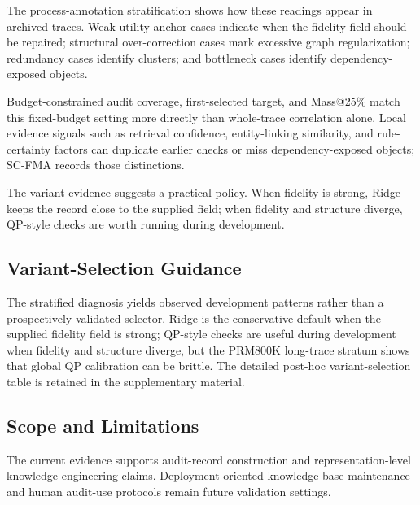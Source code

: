 \documentclass[pdflatex,sn-mathphys-num,iicol]{sn-jnl}
\begin{document}
The process-annotation stratification shows how these readings appear in archived traces. Weak utility-anchor cases indicate when the fidelity field should be repaired; structural over-correction cases mark excessive graph regularization; redundancy cases identify clusters; and bottleneck cases identify dependency-exposed objects.

Budget-constrained audit coverage, first-selected target, and Mass@25\% match this fixed-budget setting more directly than whole-trace correlation alone. Local evidence signals such as retrieval confidence, entity-linking similarity, and rule-certainty factors can duplicate earlier checks or miss dependency-exposed objects; SC-FMA records those distinctions.

The variant evidence suggests a practical policy. When fidelity is strong, Ridge keeps the record close to the supplied field; when fidelity and structure diverge, QP-style checks are worth running during development.

\subsection{Variant-Selection Guidance}

The stratified diagnosis yields observed development patterns rather than a prospectively validated selector. Ridge is the conservative default when the supplied fidelity field is strong; QP-style checks are useful during development when fidelity and structure diverge, but the PRM800K long-trace stratum shows that global QP calibration can be brittle. The detailed post-hoc variant-selection table is retained in the supplementary material.

\subsection{Scope and Limitations}
\label{sec:scope-limitations}

\medskip
\noindent The current evidence supports audit-record construction and representation-level knowledge-engineering claims. Deployment-oriented knowledge-base maintenance and human audit-use protocols remain future validation settings.
\end{document}

